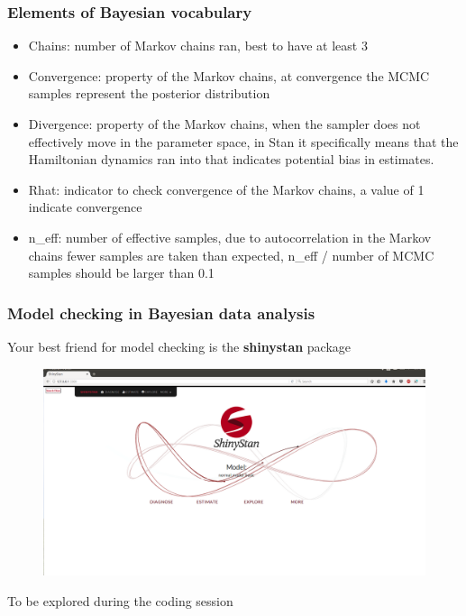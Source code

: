 \documentclass{beamer}
\begin{document}
 \begin{frame}
  \frametitle{\bf Elements of Bayesian vocabulary}
  
   \begin{itemize}
   \item Chains: number of Markov chains ran, best to have at least 3
   \item Convergence: property of the Markov chains, at convergence the MCMC samples represent the posterior distribution
   \item Divergence: property of the Markov chains, when the sampler does not effectively move in the parameter space, in Stan it specifically means that the Hamiltonian dynamics ran into that indicates potential bias in estimates.
   \item Rhat: indicator to check convergence of the Markov chains, a value of 1 indicate convergence
   \item n\_eff: number of effective samples, due to autocorrelation in the Markov chains fewer samples are taken than expected, n\_eff / number of MCMC samples should be larger than 0.1
  \end{itemize}

  
 \end{frame}
 
  \begin{frame}
  \frametitle{\bf Model checking in Bayesian data analysis}
  
  Your best friend for model checking is the \textbf{shinystan} package
  
  \begin{figure}
   \includegraphics[width=\textwidth,height=.7\textheight,keepaspectratio]{shiny.png}
  \end{figure}
  
  To be explored during the coding session

  
 \end{frame}
 
\end{document}
